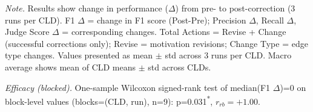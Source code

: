 \begin{table}[H]
\centreing
\begin{minipage}{\linewidth}
\centreing
\caption{Corrector Performance on Synthetically Corrupted Data (Baseline Prompt)}
\label{tab:rq1b_synthetic_correctness}
\begin{threeparttable}
\end{threeparttable}
\vspace{0.5em}
\footnotesize
\textit{Note.} Results show change in performance ($\Delta$) from pre- to post-correction (3 runs per CLD).
F1 $\Delta$ = change in F1 score (Post-Pre); Precision $\Delta$, Recall $\Delta$, Judge Score $\Delta$ = corresponding changes.
Total Actions = Revise + Change (successful corrections only); Revise = motivation revisions; Change Type = edge type changes.
Values presented as mean $\pm$ std across 3 runs per CLD. Macro average shows mean of CLD means $\pm$ std across CLDs.\par
\textit{Efficacy (blocked).} One-sample Wilcoxon signed-rank test of median(F1 $\Delta$)=0 on block-level values (blocks=(CLD, run), n=9): p=0.031\textsuperscript{*}, $r_{rb}=+1.00$.

\end{minipage}
\end{table}
